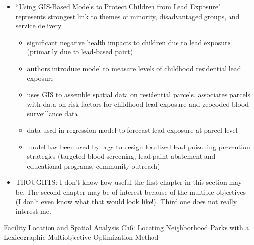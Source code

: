 \documentclass{article}
\begin{document}
\begin{itemize}
\begin{itemize}
	\item applied to urban park planning in Bogota
	\item show that model instances can be designed with acceptable level of technical difficulty
	\item solutions generated show variations in performance across multiple objectives, as well as spatial and policy impacts of alternative park infrastructure strategies
	\end{itemize}
\item ``Using GIS-Based Models to Protect Children from Lead Exposure" represents strongest link to themes of minority, disadvantaged groups, and service delivery	
	\begin{itemize}
	\item significant negative health impacts to children due to lead exposure (primarily due to lead-based paint)
	\item authors introduce model to measure levels of childhood residential lead exposure
	\item uses GIS to assemble spatial data on residential parcels, associates parcels with data on risk factors for childhood lead exposure and geocoded blood surveillance data 
	\item data used in regression model to forecast lead exposure at parcel level
	\item model has been used by orgs to design localized lead poisoning prevention strategies (targeted blood screening, lead paint abatement and educational programs, community outreach)
	\end{itemize}
\item THOUGHTS: I don't know how useful the first chapter in this section may be. The second chapter may be of interest because of the multiple objectives (I don't even know what that would look like!). Third one does not really interest me.
\end{itemize}

{\huge Facility Location and Spatial Analysis \newline Ch6: Locating Neighborhood Parks with a Lexicographic Multiobjective Optimization Method}

\setcounter{section}{0}
\end{document}
